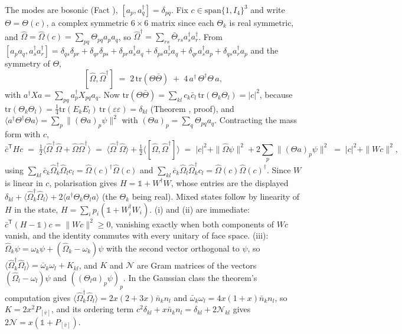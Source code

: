 The modes are bosonic (Fact ), $[a_{p}, a_{q}^{\dagger}] = \delta_{pq}$. Fix $c \in \mathrm{span}\{1, I_4\}^{3}$ and write $\Theta = \Theta(c)$, a complex symmetric $6 \times 6$ matrix since each $\Theta_{k}$ is real symmetric, and $\hat\Omega = \hat\Omega(c) = \sum_{pq}\Theta_{pq}a_{p}a_{q}$, so $\hat\Omega^{\dagger} = \sum_{rs}\bar\Theta_{rs}a_{s}^{\dagger}a_{r}^{\dagger}$. From $[a_{p}a_{q}, a_{s}^{\dagger}a_{r}^{\dagger}] = \delta_{qs}\delta_{pr} + \delta_{qr}\delta_{ps} + \delta_{pr}a_{s}^{\dagger}a_{q} + \delta_{ps}a_{r}^{\dagger}a_{q} + \delta_{qr}a_{s}^{\dagger}a_{p} + \delta_{qs}a_{r}^{\dagger}a_{p}$ and the symmetry of $\Theta$,
\[
[\hat\Omega, \hat\Omega^{\dagger}] \;=\; 2\,\mathrm{tr}(\Theta\bar\Theta) \;+\; 4\,a^{\dagger}\,\Theta^{\dagger}\Theta\,a ,
\]
with $a^{\dagger}Xa = \sum_{pq}a_{p}^{\dagger}X_{pq}a_{q}$. Now $\mathrm{tr}(\Theta\bar\Theta) = \sum_{kl}c_{k}\bar{c}_{l}\,\mathrm{tr}(\Theta_{k}\Theta_{l}) = |c|^{2}$, because $\mathrm{tr}(\Theta_{k}\Theta_{l}) = \tfrac14\mathrm{tr}(E_{k}E_{l})\,\mathrm{tr}(\varepsilon\varepsilon) = \delta_{kl}$ (Theorem , proof), and $\langle a^{\dagger}\Theta^{\dagger}\Theta a\rangle = \sum_{p}\|(\Theta a)_{p}\psi\|^{2}$ with $(\Theta a)_{p} = \sum_{q}\Theta_{pq}a_{q}$. Contracting the mass form with $c$,
\[
\bar{c}^{\mathsf{T}}Hc \;=\; \tfrac12\bigl\langle\hat\Omega^{\dagger}\hat\Omega + \hat\Omega\hat\Omega^{\dagger}\bigr\rangle
\;=\; \langle\hat\Omega^{\dagger}\hat\Omega\rangle + \tfrac12\bigl\langle[\hat\Omega, \hat\Omega^{\dagger}]\bigr\rangle
\;=\; |c|^{2} + \|\hat\Omega\psi\|^{2} + 2\sum_{p}\|(\Theta a)_{p}\psi\|^{2} \;=\; |c|^{2} + \|Wc\|^{2},
\]
using $\sum_{kl}\bar{c}_{k}\hat\Omega_{k}^{\dagger}\hat\Omega_{l}c_{l} = \hat\Omega(c)^{\dagger}\hat\Omega(c)$ and $\sum_{kl}\bar{c}_{k}\hat\Omega_{l}\hat\Omega_{k}^{\dagger}c_{l} = \hat\Omega(c)\hat\Omega(c)^{\dagger}$. Since $W$ is linear in $c$, polarisation gives $H = \mathbb{1} + W^{\dagger}W$, whose entries are the displayed $\delta_{kl} + \langle\hat\Omega_{k}^{\dagger}\hat\Omega_{l}\rangle + 2\langle a^{\dagger}\Theta_{k}\Theta_{l}a\rangle$ (the $\Theta_{k}$ being real). Mixed states follow by linearity of $H$ in the state, $H = \sum_{i}p_{i}(\mathbb{1} + W_{i}^{\dagger}W_{i})$. (i) and (ii) are immediate: $\bar{c}^{\mathsf{T}}(H - \mathbb{1})c = \|Wc\|^{2} \ge 0$, vanishing exactly when both components of $Wc$ vanish, and the identity commutes with every unitary of face space. (iii): $\hat\Omega_{k}\psi = \omega_{k}\psi + (\hat\Omega_{k} - \omega_{k})\psi$ with the second vector orthogonal to $\psi$, so $\langle\hat\Omega_{k}^{\dagger}\hat\Omega_{l}\rangle = \bar\omega_{k}\omega_{l} + K_{kl}$, and $K$ and $\mathcal{N}$ are Gram matrices of the vectors $(\hat\Omega_{l} - \omega_{l})\psi$ and $((\Theta_{l}a)_{p}\psi)_{p}$. In the Gaussian class the theorem's computation gives $\langle\hat\Omega_{k}^{\dagger}\hat\Omega_{l}\rangle = 2x(2 + 3x)\bar{n}_{k}n_{l}$ and $\bar\omega_{k}\omega_{l} = 4x(1 + x)\bar{n}_{k}n_{l}$, so $K = 2x^{2}P_{[\bar v]}$, and its ordering term $c^{2}\delta_{kl} + x\bar{n}_{k}n_{l} = \delta_{kl} + 2\mathcal{N}_{kl}$ gives $2\mathcal{N} = x(\mathbb{1} + P_{[\bar v]})$.

